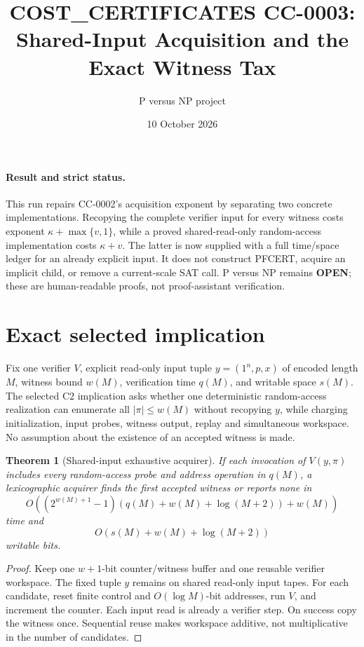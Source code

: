 \documentclass[11pt]{article}
\title{COST\_CERTIFICATES CC-0003:\\Shared-Input Acquisition and the Exact Witness Tax}
\author{P versus NP project}
\date{10 October 2026}
\newtheorem{theorem}{Theorem}
\begin{document}
\maketitle

\paragraph{Result and strict status.}
This run repairs CC-0002's acquisition exponent by separating two concrete
implementations.  Recopying the complete verifier input for every witness
costs exponent $\kappa+\max\{v,1\}$, while a proved shared-read-only
random-access implementation costs $\kappa+v$.  The latter is now supplied
with a full time/space ledger for an already explicit input.  It does not
construct PFCERT, acquire an implicit child, or remove a current-scale SAT
call.  P versus NP remains \textbf{OPEN}; these are human-readable proofs,
not proof-assistant verification.

\section{Exact selected implication}
Fix one verifier $V$, explicit read-only input tuple $y=(1^n,p,x)$ of encoded
length $M$, witness bound $w(M)$, verification time $q(M)$, and writable
space $s(M)$.  The selected C2 implication asks whether one deterministic
random-access realization can enumerate all $|\pi|\le w(M)$ without
recopying $y$, while charging initialization, input probes, witness output,
replay and simultaneous workspace.  No assumption about the existence of an
accepted witness is made.

\begin{theorem}[Shared-input exhaustive acquirer]
If each invocation of $V(y,\pi)$ includes every random-access probe and
address operation in $q(M)$, a lexicographic acquirer finds the first
accepted witness or reports none in
\[
 O\!\left((2^{w(M)+1}-1)(q(M)+w(M)+\log(M+2))+w(M)\right)
\]
time and
\[
 O(s(M)+w(M)+\log(M+2))
\]
writable bits.
\end{theorem}
\begin{proof}
Keep one $w+1$-bit counter/witness buffer and one reusable verifier
workspace.  The fixed tuple $y$ remains on shared read-only input tapes.
For each candidate, reset finite control and $O(\log M)$-bit addresses, run
$V$, and increment the counter.  Each input read is already a verifier step.
On success copy the witness once.  Sequential reuse makes workspace additive,
not multiplicative in the number of candidates.
\end{proof}
\end{document}
